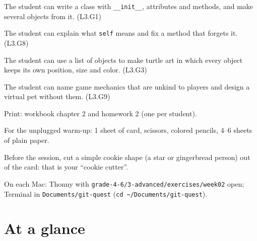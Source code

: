 
\begin{objectives}
  \item The student can write a class with \texttt{\_\_init\_\_}, attributes and methods, and make several objects from it. (L3.G1)
  \item The student can explain what \texttt{self} means and fix a method that forgets it. (L3.G8)
  \item The student can use a list of objects to make turtle art in which every object keeps its own position, size and color. (L3.G3)
  \item The student can name game mechanics that are unkind to players and design a virtual pet without them. (L3.G9)
\end{objectives}

\begin{materials}
  \item Print: workbook chapter 2 and homework 2 (one per student).
  \item For the unplugged warm-up: 1 sheet of card, scissors, colored pencils, 4--6 sheets of plain paper.
  \item Before the session, cut a simple cookie shape (a star or gingerbread person) out of the card: that is your \enquote{cookie cutter}.
  \item On each Mac: Thonny with \texttt{grade-4-6/3-advanced/exercises/week02} open; Terminal in \texttt{Documents/git-quest} (\texttt{cd \textasciitilde/Documents/git-quest}).
\end{materials}

\section{At a glance}
\begin{timeplan}
\end{timeplan}

